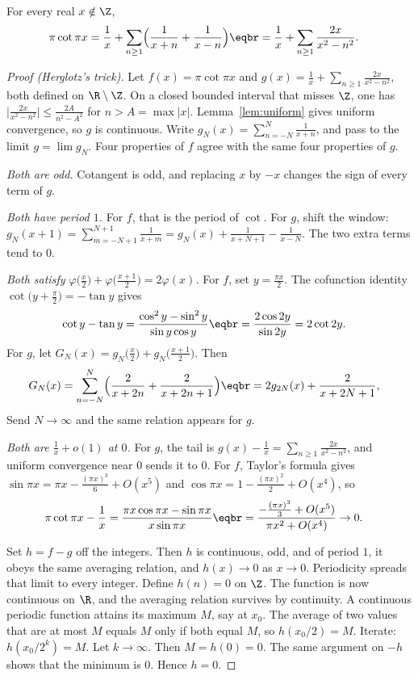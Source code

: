 \begin{theorem}[Euler]\label{thm:cot}
For every real $x\notin\Z$,
\[
\begin{aligned}\pi\cot\pi x&=\frac1x+\sum_{n\ge1}\Bigl(\frac1{x+n}+\frac1{x-n}\Bigr)\eqbr=\frac1x+\sum_{n\ge1}\frac{2x}{x^2-n^2}.\end{aligned}
\]
\end{theorem}
\begin{proof}[Proof (Herglotz's trick)]
Let $f(x)=\pi\cot\pi x$ and $g(x)=\frac1x+\sum_{n\ge1}\frac{2x}{x^2-n^2}$, both defined on $\R\setminus\Z$. On a closed bounded interval that misses $\Z$, one has $\bigl|\frac{2x}{x^2-n^2}\bigr|\le\frac{2A}{n^2-A^2}$ for $n>A=\max|x|$. Lemma~\ref{lem:uniform} gives uniform convergence, so $g$ is continuous. Write $g_N(x)=\sum_{n=-N}^N\frac1{x+n}$, and pass to the limit $g=\lim g_N$. Four properties of $f$ agree with the same four properties of $g$.

\emph{Both are odd.} Cotangent is odd, and replacing $x$ by $-x$ changes the sign of every term of $g$.

\emph{Both have period $1$.} For $f$, that is the period of $\cot$. For $g$, shift the window: $g_N(x+1)=\sum_{m=-N+1}^{N+1}\frac1{x+m}=g_N(x)+\frac1{x+N+1}-\frac1{x-N}$. The two extra terms tend to $0$.

\emph{Both satisfy $\varphi\bigl(\frac x2\bigr)+\varphi\bigl(\frac{x+1}2\bigr)=2\varphi(x)$.} For $f$, set $y=\frac{\pi x}2$. The cofunction identity $\cot\bigl(y+\frac\pi2\bigr)=-\tan y$ gives
\[
\begin{aligned}\cot y-\tan y&=\frac{\cos^2y-\sin^2y}{\sin y\cos y}\eqbr=\frac{2\cos2y}{\sin2y}=2\cot2y.\end{aligned}
\]
For $g$, let $G_N(x)=g_N\bigl(\frac x2\bigr)+g_N\bigl(\frac{x+1}2\bigr)$. Then
\[
\begin{aligned}G_N(x)&=\sum_{n=-N}^N\Bigl(\frac2{x+2n}+\frac2{x+2n+1}\Bigr)\eqbr=2g_{2N}(x)+\frac2{x+2N+1},\end{aligned}
\]
Send $N\to\infty$ and the same relation appears for $g$.

\emph{Both are $\frac1x+o(1)$ at $0$.} For $g$, the tail is $g(x)-\frac1x=\sum_{n\ge1}\frac{2x}{x^2-n^2}$, and uniform convergence near $0$ sends it to $0$. For $f$, Taylor's formula gives $\sin\pi x=\pi x-\frac{(\pi x)^3}6+O(x^5)$ and $\cos\pi x=1-\frac{(\pi x)^2}2+O(x^4)$, so
\[
\begin{aligned}\pi\cot\pi x-\frac1x&=\frac{\pi x\cos\pi x-\sin\pi x}{x\sin\pi x}\eqbr=\frac{-\frac{(\pi x)^3}3+O(x^5)}{\pi x^2+O(x^4)}\to0.\end{aligned}
\]

Set $h=f-g$ off the integers. Then $h$ is continuous, odd, and of period $1$, it obeys the same averaging relation, and $h(x)\to0$ as $x\to0$. Periodicity spreads that limit to every integer. Define $h(n)=0$ on $\Z$. The function is now continuous on $\R$, and the averaging relation survives by continuity. A continuous periodic function attains its maximum $M$, say at $x_0$. The average of two values that are at most $M$ equals $M$ only if both equal $M$, so $h(x_0/2)=M$. Iterate: $h(x_0/2^k)=M$. Let $k\to\infty$. Then $M=h(0)=0$. The same argument on $-h$ shows that the minimum is $0$. Hence $h=0$.
\end{proof}

